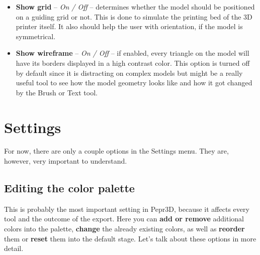 \begin{itemize}

\item \textbf{Show grid} -- \textit{On / Off} -- determines whether the model should be positioned on a guiding grid or not. This is done to simulate the printing bed of the 3D printer itself. It also should help the user with orientation, if the model is symmetrical.

\item \textbf{Show wireframe} -- \textit{On / Off} -- if enabled, every triangle on the model will have its borders displayed in a high contrast color. This option is turned off by default since it is distracting on complex models but might be a really useful tool to see how the model geometry looks like and how it got changed by the Brush or Text tool.

\end{itemize}

\section{Settings}

For now, there are only a couple options in the Settings menu. They are, however, very important to understand.

\subsection{Editing the color palette}

This is probably the most important setting in Pepr3D, because it affects every tool and the outcome of the export. Here you can \textbf{add or remove} additional colors into the palette, \textbf{change} the already existing colors, as well as \textbf{reorder} them or \textbf{reset} them into the default stage. Let's talk about these options in more detail.

